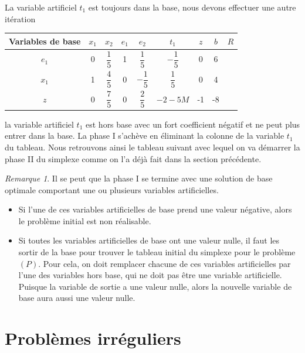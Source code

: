 \documentclass[a4paper,12pt,openany]{book}
\theoremstyle{plain}
\theoremstyle{definition}
\theoremstyle{remark}
\newtheorem{remarque}[theorem]{Remarque}
\theoremstyle{nbstyle}
\begin{document}
	La variable artificiel $t_{1}$ est toujours dans la base, nous devons effectuer une autre itération
	
	\begin{center}
		\begin{tabular}{|c|cccccc|c|c|}
			\hline
			Variables de base & $x_{1}$ & $x_{2}$ & $e_{1}$ & $e_{2}$ & $t_{1}$ & $z$ & $b$ & $R$ \\
			\hline
			$e_{1}$ & 0 & $\dfrac{1}{5}$ & 1 & $\dfrac{1}{5}$ & $-\dfrac{1}{5}$ & 0 & 6 &  \\
			$x_{1}$ & 1 & $\dfrac{4}{5}$ & 0 & $-\dfrac{1}{5}$ & $\dfrac{1}{5}$ & 0 & 4 &  \\
			\hline
			$z$ & 0 & $\dfrac{7}{5}$ & 0 & $\dfrac{2}{5}$ & $-2-5 M$ & -1 & -8 &  \\
			\hline
		\end{tabular}
	\end{center}
	
	la variable artificiel $t_{1}$ est hors base avec un fort coefficient négatif et ne peut plus entrer dans la base. La phase I s'achève en éliminant la colonne de la variable $t_{1}$ du tableau. Nous retrouvons ainsi le tableau suivant avec lequel on va démarrer la phase II du simplexe comme on l'a déjà fait dans la section précédente.
	
	\begin{remarque}
		Il se peut que la phase I se termine avec une solution de base optimale comportant une ou plusieurs variables artificielles.
		
		\begin{itemize}
			\item Si l'une de ces variables artificielles de base prend une valeur négative, alors le problème initial est non réalisable.
			\item Si toutes les variables artificielles de base ont une valeur nulle, il faut les sortir de la base pour trouver le tableau initial du simplexe pour le problème $ ( P ) $. Pour cela, on doit remplacer chacune de ces variables artificielles par l'une des variables hors base, qui ne doit pas être une variable artificielle. Puisque la variable de sortie a une valeur nulle, alors la nouvelle variable de base aura aussi une valeur nulle.
		\end{itemize}
	\end{remarque}
	
	\section{Problèmes irréguliers}
\end{document}
